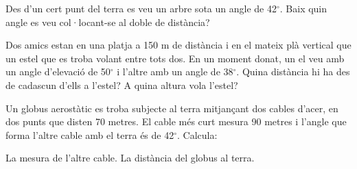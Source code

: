 \begin{mylist}
	\exer
	Des d'un cert punt del terra es veu un arbre sota un angle de 42${}^\circ$. Baix
	quin angle es veu col·locant-se al doble de distància?
	
	\exer
	Dos amics estan en una platja a 150 m de distància i en el mateix
	plà vertical que un estel que es troba volant entre tots dos. En un
	moment donat, un el veu amb un angle d'elevació de 50${}^\circ$ i l'altre amb
	un angle de 38$^\circ$. Quina distància hi ha des de cadascun d'ells a
	l'estel? A quina altura vola l'estel?
	
	\exer
	Un globus aerostàtic es troba subjecte al terra mitjançant dos cables
	d'acer, en dos punts que disten 70 metres. El cable més curt mesura 90
	metres i l'angle que forma l'altre cable amb el terra és de 42${}^\circ$.
	Calcula:
	
	\begin{tasks}	 
		\task
		La mesura de l'altre cable.
		\task
		La distància del globus al terra.
	\end{tasks}

	
\end{mylist}

